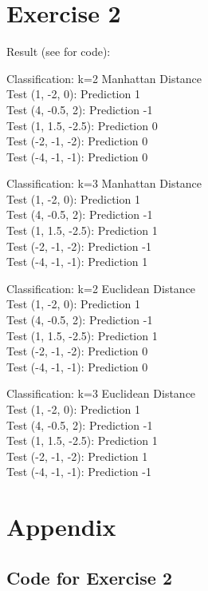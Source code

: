 \documentclass[12pt]{article}
\begin{document}
\pagebreak
\section*{Exercise 2}
Result (see  for code):
\bigskip

Classification: k=2 Manhattan Distance \\
Test (1, -2, 0): Prediction 1 \\
Test (4, -0.5, 2): Prediction -1 \\
Test (1, 1.5, -2.5): Prediction 0 \\
Test (-2, -1, -2): Prediction 0 \\
Test (-4, -1, -1): Prediction 0
\bigskip

Classification: k=3 Manhattan Distance \\
Test (1, -2, 0): Prediction 1 \\
Test (4, -0.5, 2): Prediction -1 \\
Test (1, 1.5, -2.5): Prediction 1 \\
Test (-2, -1, -2): Prediction -1 \\
Test (-4, -1, -1): Prediction 1
\bigskip

Classification: k=2 Euclidean Distance \\
Test (1, -2, 0): Prediction 1 \\
Test (4, -0.5, 2): Prediction -1 \\
Test (1, 1.5, -2.5): Prediction 1 \\
Test (-2, -1, -2): Prediction 0 \\
Test (-4, -1, -1): Prediction 0
\bigskip

Classification: k=3 Euclidean Distance \\
Test (1, -2, 0): Prediction 1 \\
Test (4, -0.5, 2): Prediction -1 \\
Test (1, 1.5, -2.5): Prediction 1 \\
Test (-2, -1, -2): Prediction 1 \\
Test (-4, -1, -1): Prediction -1
\bigskip

\section*{Appendix}\label{appendix}
\subsection*{Code for Exercise 2}

\end{document}
